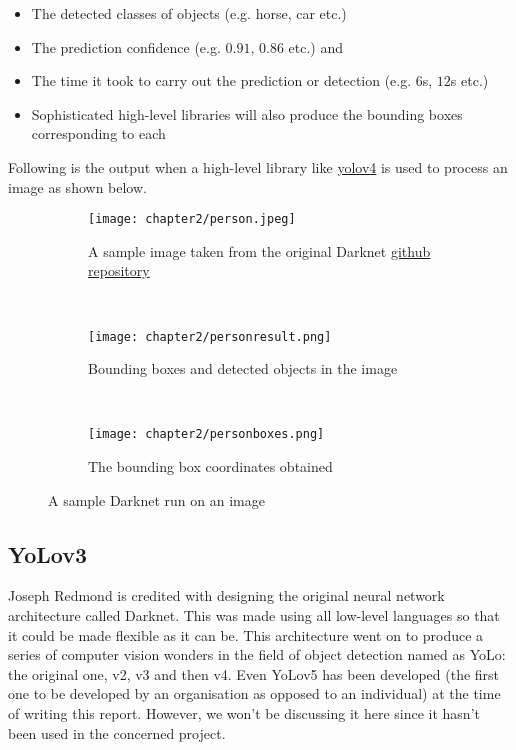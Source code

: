 \begin{itemize}
  \item The detected classes of objects (e.g. horse, car etc.)
  \item	The prediction confidence (e.g. $0.91$, $0.86$ etc.) and
  \item	The time it took to carry out the prediction or detection (e.g. $6$s, $12$s etc.)
  \item	Sophisticated high-level libraries will also produce the bounding boxes corresponding to each
\end{itemize}

\vspace{-0.1in}

Following is the output when a high-level library like \href{https://pypi.org/project/yolov4/}{yolov4} is used to process an image as shown below.

\begin{figure}[h]

\begin{center}
\begin{subfigure}{0.7\textwidth}
  \texttt{[image: chapter2/person.jpeg]}
  \caption{A sample image taken from the original Darknet \href{https://github.com/AlexeyAB/darknet}{github repository}}
  \label{fig:person_sub1}
 \end{subfigure} \\
 \begin{subfigure}{0.7\textwidth}
  \texttt{[image: chapter2/personresult.png]}
  \caption{Bounding boxes and detected objects in the image}
  \label{fig:person_sub2}
  \end{subfigure} \\
  \begin{subfigure}{0.7\textwidth}
   \texttt{[image: chapter2/personboxes.png]}
   \caption{The bounding box coordinates obtained}
   \label{fig:person_sub3}
 \end{subfigure}

 \caption{A sample Darknet run on an image}
 \label{fig:person_ref}

\end{center}

\end{figure}



\subsection{YoLov3}
Joseph Redmond is credited with designing the original neural network architecture called Darknet. This was made using all low-level languages so that it could be made flexible as it can be. This architecture went on to produce a series of computer vision wonders in the field of object detection named as YoLo: the original one, v2, v3 and then v4. Even YoLov5 has been developed (the first one to be developed by an organisation as opposed to an individual) at the time of writing this report. However, we won’t be discussing it here since it hasn’t been used in the concerned project. \par

